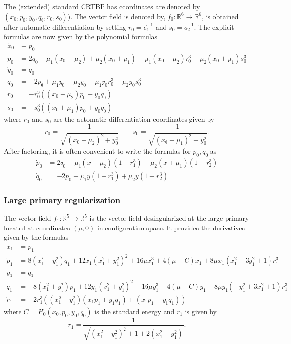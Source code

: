 \documentclass[10pt]{article}
\newcommand{\rr}{\mathbb{R}}
\newcommand{\paren}[1]{\left( #1 \right)}
\begin{document}
The (extended) standard CRTBP has coordinates are denoted by $(x_0,p_0,y_0,q_0,r_0,s_0))$. The vector field is denoted by, $f_0 : \rr^6 \to \rr^6$, is obtained after automatic differentiation by setting $r_0 = d_1^{-1}$ and $s_0 = d_2^{-1}$. The explicit formulas are now given by the polynomial formulas
\begin{align*} 
\dot x_0 & = p_0 \\ 
\dot p_0 & = 2 q_0 + \mu _ { 1 } \left( x_0 - \mu _ { 2 } \right) + \mu _ { 2 } \left( x_0 + \mu _ { 1 } \right) - \mu _ { 1 } \left( x_0 - \mu _ { 2 } \right) r_0^3 - \mu _ { 2 } \left( x_0 + \mu _ { 1 } \right) s_0^3 \\ 
\dot y_0 & = q_0 \\ 
\dot q_0 & = - 2 p_0 + \mu _ { 1 } y_0 + \mu _ { 2 } y_0 - \mu _ { 1 } y_0 r_0^3 - \mu _ { 2 } y_0 s_0^3 \\
\dot{r_0} & = - r_0^3 \left( \left( x_0 - \mu_2 \right) p_0 + y_0 q_0 \right) \\ 
\dot{s_0}  & = - s_0^3 \left( \left( x_0 + \mu_1\right) p_0 + y_0 q_0 \right) 
\end{align*}
where $r_0$ and $s_0$ are the automatic differentiation coordinates given by 
\[
r_0 = \frac{1}{\sqrt{(x_0-\mu_2)^2 + y_0^2}} \qquad s_0 = \frac{1}{\sqrt{(x_0+\mu_1)^2 + y_0^2}}.
\]
After factoring, it is often convenient to write the formulas for $\dot p_0, \dot q_0$ as 
\begin{align*}
	\dot p_0 & = 2 q_0 + \mu_1 \paren{x - \mu_2} \paren{1 - r_1^3} + \mu_2 \paren{x + \mu_1} \paren{1 - r_2^3} \\
	\dot q_0 & = -2 p_0 + \mu_1 y \paren{1 - r_1^3} + \mu_2 y \paren{1 - r_2^3}
\end{align*}

\subsubsection{Large primary regularization}
The vector field $f_1: \rr^5 \to \rr^5$ is the vector field desingularized at the large primary located at coordinates $(\mu,0)$ in configuration space. It provides the derivatives given by the formulas
\begin{align*}
\dot x_1 & = p_1 \\
\dot p_1 & = { 8 \left( x_1^2 + y_1^2 \right) q_1 + 12 x_1 \left( x_1^2 + y_1^2 \right)^2 + 16 \mu x_1^3 + 4 ( \mu - C ) x_1 + 8 \mu x_1 \left( x_1^2 - 3y_1^2 + 1 \right) r_1^3 } \\
\dot y_1 & = q_1 \\
\dot q_1 & =  { - 8 \left( x_1^2 + y_1^2 \right) p_1 + 12 y_1 \left( x_1^2 + y_1^2 \right)^2 - 16 \mu y_1^3 + 4 ( \mu - C ) y_1 + 8 \mu y_1 \left( - y_1^2 + 3 x_1^2+ 1 \right) r_1^3 } \\
 \dot r_1 & =   { - 2 r_1^3 \left( \left( x_1^2 + y_1^2 \right) ( x_1 p_1 + y_1 q_1 ) + ( x_1 p_1 - y_1 q_1 ) \right) }
\end{align*}
where $C = H_0(x_0,p_0,y_0,q_0)$ is the standard energy and $r_1$ is given by 
\[
r_1 = \frac{1}{\sqrt{(x_1^2 + y_1^2)^2 + 1 + 2(x_1^2 - y_1^2)}}.
\]
\end{document}
